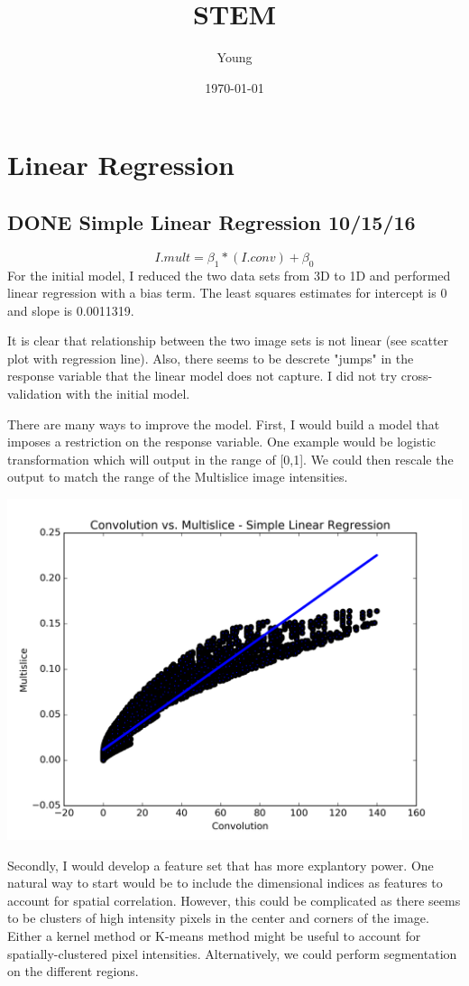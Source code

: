 \documentclass[11pt]{article}
\author{Young}
\date{\today}
\title{STEM}
\begin{document}
\maketitle

\section{Linear Regression}
\label{sec-1}
\subsection{{\bfseries\sffamily DONE} Simple Linear Regression 10/15/16}
\label{sec-1-1}
\[I.mult = \beta_1*(I.conv)+\beta_0\]
For the initial model, I reduced the two data sets from 3D to 1D and
performed linear regression with a bias term. The least squares
estimates for intercept is 0 and slope is 0.0011319. 

It is clear that relationship between the two image sets is not linear
(see scatter plot with regression line). Also, there seems to be
descrete "jumps" in the response variable that the linear model does
not capture. I did not try cross-validation with the initial model.

There are many ways to improve the model. First, I would build a model
that imposes a restriction on the response variable. One example would
be logistic transformation which will output in the range of [0,1]. We
could then rescale the output to match the range of the Multislice
image intensities.  

\includegraphics[width=.9\linewidth]{./images/slr.png}

Secondly, I would develop a feature set that has more explantory
power. One natural way to start would be to include the dimensional
indices as features to account for spatial correlation. However, this
could be complicated as there seems to be clusters of high intensity
pixels in the center and corners of the image. Either a kernel method
or K-means method might be useful to account for spatially-clustered
pixel intensities. Alternatively, we could perform segmentation on the
different regions.
\end{document}
